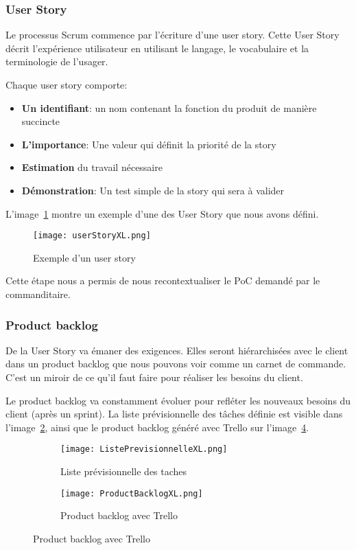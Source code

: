 \subsubsection{User Story}
Le processus Scrum commence par l'écriture d'une user story.
Cette User Story décrit l'expérience utilisateur en utilisant le langage, le vocabulaire et la terminologie de l'usager.   

Chaque user story comporte: 
\begin{itemize}
    \item \textbf{Un identifiant}: un nom contenant la fonction du produit de manière succincte  
    \item \textbf{L'importance}: Une valeur qui définit la priorité de la story  
    \item \textbf{Estimation} du travail nécessaire
    \item \textbf{Démonstration}: Un test simple de la story qui sera à valider   
\end{itemize}

L'image~\ref{fig:userStory} montre un exemple d'une des User Story que nous avons défini.
\begin{figure}[h!]
  \centering
  \texttt{[image: userStoryXL.png]}
	\caption[]{Exemple d’un user story}
	\label{fig:userStory}
\end{figure}

Cette étape nous a permis de nous recontextualiser le PoC demandé par le commanditaire. 


\subsubsection{Product backlog}
De la User Story va émaner des exigences.
Elles seront hiérarchisées avec le client dans un product backlog que nous pouvons voir comme un carnet de commande. 
C'est un miroir de ce qu'il faut faire pour réaliser les besoins du client.  

Le product backlog va constamment évoluer pour refléter les nouveaux besoins du client (après un sprint). 
La liste prévisionnelle des tâches définie est visible dans l'image~\ref{fig:listeTaches}, ainsi que le product backlog généré avec Trello sur l'image~\ref{fig:prodBack}.

\begin{figure}
  \centering

  \begin{subfigure}{.5\textwidth}
    \centering
    \texttt{[image: ListePrevisionnelleXL.png]}
    \caption[]{Liste prévisionnelle des taches}
    \label{fig:listeTaches}
  \end{subfigure}%
  \begin{subfigure}{.5\textwidth}
    \centering
    \texttt{[image: ProductBacklogXL.png]}
    \caption[]{Product backlog avec Trello}
    \label{fig:prodBack}
  \end{subfigure}

\end{figure}

